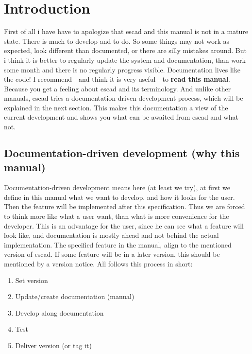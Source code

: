 \documentclass[a4paper, 12pt, openany]{scrbook}
\begin{document}
\chapter{Introduction}
First of all i have have to apologize that escad and this manual is not in a mature state. There is much to develop and to do. So some things may not work as expected, look different than documented, or there are silly mistakes around. But i think it is better to regularly update the system and documentation, than work some month and there is no regularly progress visible. Documentation lives like the code! I recommend - and think it is very useful - to \textbf{read this manual}. Because you get a feeling about escad and its terminology. And unlike other manuals, escad tries a documentation-driven development process, which will be explained in the next section. This makes this documentation a view of the current development and shows you what can be awaited from escad and what not.
\section{Documentation-driven development (why this manual)}
Documentation-driven development means here (at least we try), at first we define in this manual what we want to develop, and how it looks for the user. Then the feature will be implemented after this specification. Thus we are forced to think more like what a user want, than what is more convenience for the developer. This is an advantage for the user, since he can see what a feature will look like, and documentation is mostly ahead and not behind the actual implementation. The specified feature in the manual, align to the mentioned version of escad. If some feature will be in a later version, this should be mentioned by a version notice.
All follows this process in short:
\begin{enumerate}
\item Set version
\item Update/create documentation (manual)
\item Develop along documentation
\item Test
\item Deliver version (or tag it)
\end{enumerate}
\end{document}
